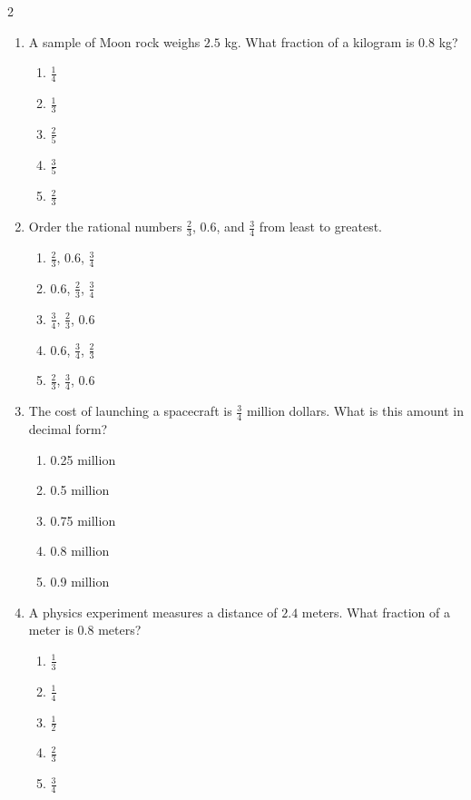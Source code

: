 \documentclass[10pt]{article}
\begin{document}
\begin{multicols}{2}
\begin{enumerate}[label=\textbf{Q\arabic*.}, leftmargin=*, itemsep=6pt, parsep=0pt]
  \item \small A sample of Moon rock weighs $2.5$ kg. What fraction of a kilogram is $0.8$ kg?
  \begin{enumerate}[label=(\Alph*), leftmargin=0.6cm, nosep, itemsep=2pt]
    \item $\frac{1}{4}$
    \item $\frac{1}{3}$
    \item $\frac{2}{5}$
    \item $\frac{3}{5}$
    \item $\frac{2}{3}$
  \end{enumerate}

  \item \small Order the rational numbers $\frac{2}{3}$, $0.6$, and $\frac{3}{4}$ from least to greatest.
  \begin{enumerate}[label=(\Alph*), leftmargin=0.6cm, nosep, itemsep=2pt]
    \item $\frac{2}{3}$, $0.6$, $\frac{3}{4}$
    \item $0.6$, $\frac{2}{3}$, $\frac{3}{4}$
    \item $\frac{3}{4}$, $\frac{2}{3}$, $0.6$
    \item $0.6$, $\frac{3}{4}$, $\frac{2}{3}$
    \item $\frac{2}{3}$, $\frac{3}{4}$, $0.6$
  \end{enumerate}

  \item \small The cost of launching a spacecraft is $\frac{3}{4}$ million dollars. What is this amount in decimal form?
  \begin{enumerate}[label=(\Alph*), leftmargin=0.6cm, nosep, itemsep=2pt]
    \item 0.25 million
    \item 0.5 million
    \item 0.75 million
    \item 0.8 million
    \item 0.9 million
  \end{enumerate}

  \item \small A physics experiment measures a distance of $2.4$ meters. What fraction of a meter is $0.8$ meters?
  \begin{enumerate}[label=(\Alph*), leftmargin=0.6cm, nosep, itemsep=2pt]
    \item $\frac{1}{3}$
    \item $\frac{1}{4}$
    \item $\frac{1}{2}$
    \item $\frac{2}{3}$
    \item $\frac{3}{4}$
  \end{enumerate}


\end{enumerate}
\end{multicols}
\end{document}
